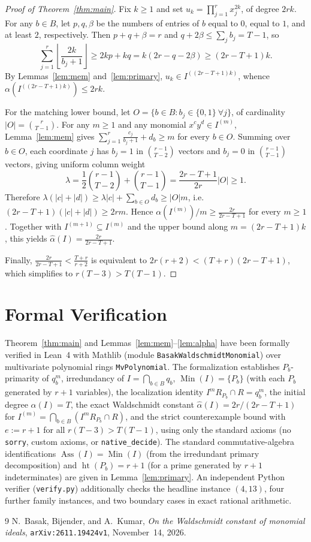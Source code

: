 \documentclass[11pt]{article}
\newcommand{\Ass}{\operatorname{Ass}}
\newcommand{\Min}{\operatorname{Min}}
\newcommand{\htp}{\operatorname{ht}}
\begin{document}
\begin{proof}[Proof of Theorem~\ref{thm:main}]
Fix $k \ge 1$ and set $u_k = \prod_{j=1}^r x_j^{2k}$, of degree $2rk$. For any $b \in B$, let $p, q, \beta$ be the numbers of entries of $b$ equal to $0$, equal to $1$, and at least $2$, respectively. Then $p + q + \beta = r$ and $q + 2\beta \le \sum_j b_j = T - 1$, so
\[
  \sum_{j=1}^r \left\lfloor \frac{2k}{b_j + 1} \right\rfloor \ge 2kp + kq = k(2r - q - 2\beta) \ge (2r - T + 1)k.
\]
By Lemmas~\ref{lem:mem} and~\ref{lem:primary}, $u_k \in I^{((2r - T + 1)k)}$, whence $\alpha(I^{((2r - T + 1)k)}) \le 2rk$.

For the matching lower bound, let $O = \{b \in B : b_j \in \{0, 1\}\ \forall j\}$, of cardinality $|O| = \binom{r}{T - 1}$. For any $m \ge 1$ and any monomial $x^c y^d \in I^{(m)}$, Lemma~\ref{lem:mem} gives $\sum_{j=1}^r \frac{c_j}{b_j + 1} + d_b \ge m$ for every $b \in O$. Summing over $b \in O$, each coordinate $j$ has $b_j = 1$ in $\binom{r - 1}{T - 2}$ vectors and $b_j = 0$ in $\binom{r - 1}{T - 1}$ vectors, giving uniform column weight
\[
  \lambda = \frac{1}{2}\binom{r - 1}{T - 2} + \binom{r - 1}{T - 1} = \frac{2r - T + 1}{2r} |O| \ge 1.
\]
Therefore $\lambda(|c| + |d|) \ge \lambda|c| + \sum_{b \in O} d_b \ge |O|m$, i.e.\ $(2r - T + 1)(|c| + |d|) \ge 2rm$. Hence $\alpha(I^{(m)})/m \ge \frac{2r}{2r - T + 1}$ for every $m \ge 1$. Together with $I^{(m+1)} \subseteq I^{(m)}$ and the upper bound along $m = (2r - T + 1)k$, this yields $\widehat{\alpha}(I) = \frac{2r}{2r - T + 1}$.

Finally, $\frac{2r}{2r - T + 1} < \frac{T + r}{r + 2}$ is equivalent to $2r(r + 2) < (T + r)(2r - T + 1)$, which simplifies to $r(T - 3) > T(T - 1)$.
\end{proof}

\section{Formal Verification}

Theorem~\ref{thm:main} and Lemmas~\ref{lem:mem}--\ref{lem:alpha} have been formally verified in Lean~4 with Mathlib (module \texttt{Basak}\allowbreak\texttt{Waldschmidt}\allowbreak\texttt{Monomial}) over multivariate polynomial rings \texttt{MvPolynomial}. The formalization establishes $P_b$-primarity of $q_b^m$, irredundancy of $I = \bigcap_{b \in B} q_b$, $\Min(I) = \{P_b\}$ (with each $P_b$ generated by $r + 1$ variables), the localization identity $I^m R_{P_b} \cap R = q_b^m$, the initial degree $\alpha(I) = T$, the exact Waldschmidt constant $\widehat{\alpha}(I) = 2r/(2r - T + 1)$ for $I^{(m)} = \bigcap_{b \in B} (I^m R_{P_b} \cap R)$, and the strict counterexample bound with $e := r + 1$ for all $r(T - 3) > T(T - 1)$, using only the standard axioms (no \texttt{sorry}, custom axioms, or \texttt{native\_decide}). The standard commutative-algebra identifications $\Ass(I) = \Min(I)$ (from the irredundant primary decomposition) and $\htp(P_b) = r + 1$ (for a prime generated by $r + 1$ indeterminates) are given in Lemma~\ref{lem:primary}. An independent Python verifier (\texttt{verify.py}) additionally checks the headline instance $(4, 13)$, four further family instances, and two boundary cases in exact rational arithmetic.

\begin{thebibliography}{9}
N.~Basak, Bijender, and A.~Kumar,
\emph{On the Waldschmidt constant of monomial ideals},
\texttt{arXiv:2611.19424v1}, November~14, 2026.
\end{thebibliography}
\end{document}
